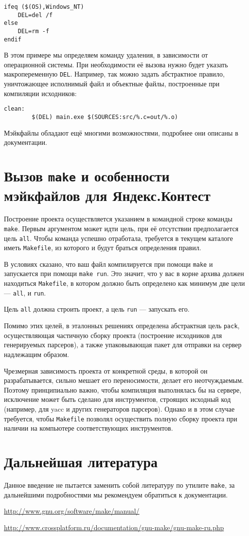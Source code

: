 \documentclass[11pt,a4paper,oneside]{article}
\begin{document}
\begin{verbatim}
ifeq ($(OS),Windows_NT)
    DEL=del /f
else
    DEL=rm -f
endif
\end{verbatim}

В этом примере мы определяем команду удаления, в зависимости от операционной системы.
При необходимости её вызова нужно будет указать макропеременную \verb!DEL!. Например, так
можно задать абстрактное правило, уничтожающее исполнимый файл и объектные файлы, 
построенные при компиляции исходников:

\begin{verbatim}
clean:
        $(DEL) main.exe $(SOURCES:src/%.c=out/%.o)
\end{verbatim}

Мэйкфайлы обладают ещё многими возможностями, подробнее они описаны в документации.

\section*{Вызов \texttt{make} и особенности мэйкфайлов для Яндекс.Контест}

Построение проекта осуществляется указанием в командной строке команды \verb!make!.
Первым аргументом может идти цель, при её отсутствии предполагается цель \verb!all!.
Чтобы команда успешно отработала, требуется в текущем каталоге иметь \verb!Makefile!,
из которого и будут браться определения правил.

В условиях сказано, что ваш файл компилируется при помощи \verb!make! и запускается при
помощи \verb!make run!. Это значит, что у вас в корне архива должен находиться 
\verb!Makefile!, в котором должно быть определено как минимум две
цели --- \verb!all!, и \verb!run!. 

Цель \verb!all! должна строить проект, а цель \verb!run! --- запускать его.

Помимо этих целей, в эталонных решениях определена абстрактная цель \verb!pack!, 
осуществляющая частичную сборку проекта (построение исходников для генерируемых парсеров), 
а также упаковывающая пакет для отправки на сервер надлежащим образом.

Чрезмерная зависимость проекта от конкретной среды, в которой он разрабатывается,
сильно мешает его переносимости, делает его неотчуждаемым. Поэтому 
принципиально важно, чтобы компиляция выполнялась бы на сервере, исключение может быть
сделано для инструментов, строящих исходный код (например, для yacc и других генераторов парсеров).
Однако и в этом случае требуется, чтобы \verb!Makefile! позволял осуществить полную
сборку проекта при наличии на компьютере соответствующих инструментов.

\section*{Дальнейшая литература}

Данное введение не пытается заменить собой литературу по утилите \verb!make!, за 
дальнейшими подробностями мы рекомендуем обратиться к документации.

\url{http://www.gnu.org/software/make/manual/}

\url{http://www.crossplatform.ru/documentation/gnu-make/gnu-make-ru.php}
\end{document}
